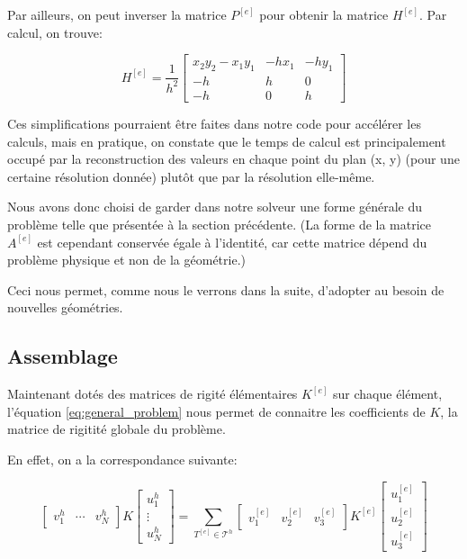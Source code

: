 \documentclass{article}
\begin{document}
Par ailleurs, on peut inverser la matrice $P^{[e]}$ pour obtenir
la matrice $H^{[e]}$. Par calcul, on trouve:

\begin{equation}
    H^{[e]} = \frac{1}{h^2}
    \begin{bmatrix}
        x_2 y_2 - x_1 y_1 & -hx_1 & -hy_1 \\
        -h & h & 0 \\
        -h & 0 & h
    \end{bmatrix}
\end{equation}

Ces simplifications pourraient être faites dans notre code pour
accélérer les calculs, mais en pratique, on constate que le temps de
calcul est principalement occupé par la reconstruction des valeurs
en chaque point du plan (x, y) (pour une certaine résolution donnée)
plutôt que par la résolution elle-même.

Nous avons donc choisi de garder dans notre solveur une forme générale
du problème telle que présentée à la section précédente.
(La forme de la matrice $A^{[e]}$ est cependant conservée égale à l'identité,
car cette matrice dépend du problème physique et non de la géométrie.)

Ceci nous permet, comme nous le verrons dans la suite,
d'adopter au besoin de nouvelles géométries.

\subsection{Assemblage}

Maintenant dotés des matrices de rigité élémentaires $K^{[e]}$
sur chaque élément, l'équation \ref{eq:general_problem} nous permet
de connaitre les coefficients de $K$, la matrice de rigitité globale
du problème.

En effet, on a la correspondance suivante:

\begin{equation}
    \begin{bmatrix}
        v^h_1 & \cdots & v^h_N
    \end{bmatrix}
    K
    \begin{bmatrix}
        u^h_1 \\ \vdots \\ u^h_N
    \end{bmatrix}
    = \sum_{T^{[e]} \in \mathcal{T}^h}
    \begin{bmatrix}
        v^{[e]}_1 & v^{[e]}_2 & v^{[e]}_3
    \end{bmatrix}
    K^{[e]}
    \begin{bmatrix}
        u^{[e]}_1 \\ u^{[e]}_2 \\ u^{[e]}_3
    \end{bmatrix}
    \label{eq:assemblage}
\end{equation}
\end{document}
